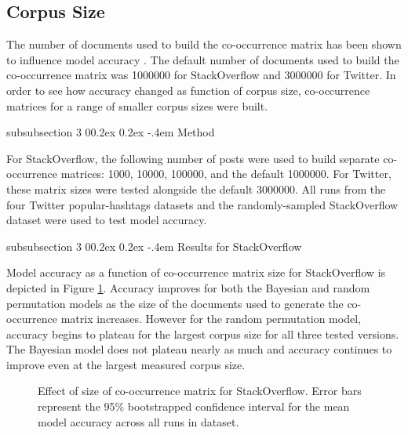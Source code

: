 \documentclass[man,floatsintext,donotrepeattitle]{apa6}
\makeatletter
\renewcommand{\subsubsection}{%
  \@startsection
  {subsubsection}%
  {3}%
  {\parindent}%
  {0\baselineskip \@plus 0.2ex \@minus 0.2ex}%
  {-.4em}%
  {\normalfont\normalsize\bfseries\addperi}}
\makeatother
\begin{document}
\subsection{Corpus Size}

The number of documents used to build the co-occurrence matrix has been shown to influence model accuracy \parencite{Sahlgren2008}.
The default number of documents used to build the co-occurrence matrix was \num{1000000} for StackOverflow and \num{3000000} for Twitter.
In order to see how accuracy changed as function of corpus size, 
co-occurrence matrices for a range of smaller corpus sizes were built.

\subsubsection{Method}

For StackOverflow, the following number of posts were used to build separate co-occurrence matrices: \num{1000}, \num{10000}, \num{100000}, and the default \num{1000000}.
For Twitter, these matrix sizes were tested alongside the default \num{3000000}.
All runs from the four Twitter popular-hashtags datasets and the randomly-sampled StackOverflow dataset were used to test model accuracy.

\subsubsection{Results for StackOverflow}

Model accuracy as a function of co-occurrence matrix size for StackOverflow is depicted in Figure \ref{figContextDocumentSizeSO}.
Accuracy improves for both the Bayesian and random permutation models as the size of the documents used to generate the co-occurrence matrix increases.
However for the random permutation model, accuracy begins to plateau for the largest corpus size for all three tested versions. 
The Bayesian model does not plateau nearly as much and accuracy continues to improve even at the largest measured corpus size. 

\begin{figure}[!htbp]
  \caption{
    Effect of size of co-occurrence matrix for StackOverflow.
    Error bars represent the 95\% bootstrapped confidence interval for the mean model accuracy across all runs in dataset.
  }
  \label{figContextDocumentSizeSO}
\end{figure}
\end{document}
